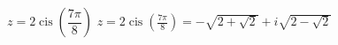 { $z = 2\operatorname{cis}\left(\dfrac{7\pi}{8}\right)$ }
{ $z = 2\operatorname{cis}\left(\frac{7\pi}{8}\right) = -\sqrt{2 + \sqrt{2}} + i\sqrt{2 - \sqrt{2}}$ }
